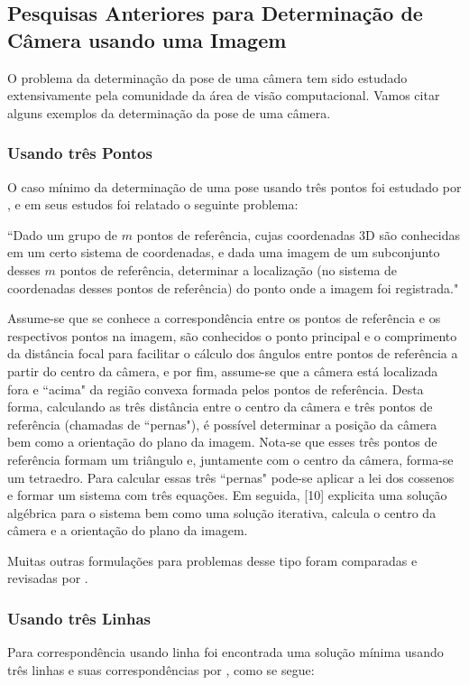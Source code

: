\subsection{Pesquisas Anteriores para Determinação de Câmera usando uma Imagem}

 O problema da determinação da pose de uma câmera  tem sido estudado extensivamente pela comunidade da área de visão computacional. Vamos citar alguns exemplos da determinação da pose de uma câmera.

\subsubsection{Usando três Pontos}
O caso mínimo da determinação de uma pose usando três pontos foi estudado por \cite{fischler}, e em seus estudos foi relatado o seguinte problema: 

``Dado um grupo de $m$ pontos de referência, cujas coordenadas 3D são conhecidas em um certo sistema de coordenadas, e dada uma imagem de um subconjunto desses $ m $ pontos de referência, determinar a localização (no sistema de coordenadas desses pontos de referência) do ponto onde a imagem foi registrada."

Assume-se que se conhece a correspondência entre os pontos de referência e os respectivos pontos na imagem, são conhecidos o ponto principal e o comprimento da distância focal para facilitar o cálculo dos ângulos entre pontos de referência a partir do centro da câmera, e por fim, assume-se que a câmera está localizada fora e ``acima" da região convexa formada pelos pontos de referência.
Desta forma, calculando as três distância entre o centro da câmera e  três pontos de referência (chamadas de ``pernas"), é possível determinar a posição da câmera bem como a orientação do plano da imagem. Nota-se que esses três pontos de referência formam um triângulo e, juntamente com o  centro da câmera, forma-se um tetraedro. Para calcular essas três ``pernas" pode-se aplicar a lei dos cossenos e formar um sistema com três equações. Em seguida, [10] explicita uma solução algébrica para o sistema bem como uma solução iterativa, calcula o centro da câmera e a orientação do plano da imagem.

Muitas outras formulações para problemas desse tipo foram comparadas e revisadas por \cite{haralick}. 

\subsubsection{Usando três Linhas}
 Para correspondência usando linha foi encontrada uma solução mínima usando três linhas e suas correspondências por \cite{chen}, como se segue:

